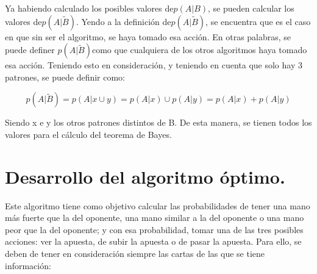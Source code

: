 Ya habiendo calculado los posibles valores de$ p(A | B)$, se pueden calcular los valores de$ p(A | \tilde{B})$.
Yendo a la definición de$ p(A | \tilde{B})$, se encuentra que es el caso en que sin ser el algoritmo, se haya tomado esa acción. En otras palabras, se puede definer $ p(A | \tilde{B})$como que cualquiera de los otros algoritmos haya tomado esa acción. Teniendo esto en consideración, y teniendo en cuenta que solo hay 3 patrones, se puede definir como:

\[ 
p(A | \tilde{B})= p(A | x \cup y) = p(A | x) \cup p(A | y) =  p(A | x) + p(A | y) 
\]

Siendo x e y los otros patrones distintos de B.
De esta manera, se tienen todos los valores para el cálculo del teorema de Bayes.

\section {Desarrollo del algoritmo óptimo.}
\label{sec:optimus}

Este algoritmo tiene como objetivo calcular las probabilidades de tener una mano más fuerte que la del oponente, una mano similar a la del oponente o una mano peor que la del oponente; y con esa probabilidad, tomar una de las tres posibles acciones: ver la apuesta, de subir la apuesta o de pasar la apuesta. Para ello, se deben de tener en consideración siempre las cartas de las que se tiene información:

